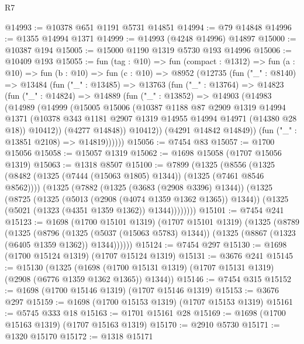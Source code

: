 \begin{lexlean}{R7}
\begin{coremodule}
@14993 := @10378 @651 @1191 @5731 @14851
@14994 := @79 @14848
@14996 := @1355 @14994 @1371
@14999 := @14993 (@4248 @14996) @14897
@15000 := @10387 @194
@15005 := @15000 @1190 @1319 @5730 @193 @14996
@15006 := @10409 @193
@15055 := fun (tag : @10) =>
  fun (compact : @1312) =>
  fun (a : @10) =>
  fun (b : @10) =>
  fun (c : @10) =>
  @8952
    (@12735
      (fun ("_" : @8140) =>
      @13484
        (fun ("_" : @13485) =>
        @13763
          (fun ("_" : @13764) =>
          @14823
            (fun ("_" : @14824) =>
            @14889
              (fun ("_" : @13852) =>
              @14903
                (@14983
                  (@14989
                    (@14999
                      (@15005
                        @15006
                        (@10387
                          @1188
                          @87
                          @2909
                          @1319
                          @14994
                          @1371
                          (@10378 @343 @1181 @2907 @1319 @14955 @14994 @14971 (@14380 @28 @18))
                          @10412))
                      (@4277 @14848))
                    @10412))
                (@4291 @14842 @14849))
              (fun ("_" : @13851 @2108) => @14819))))))
@15056 := @7454 @83
@15057 := @1700 @15056
@15058 := @15057 @1319
@15062 := @1698 @15058 (@1707 @15056 @1319)
@15063 := @1318 @8507
@15100 := @7899
    (@1325
      (@8556
        (@1325 (@8482 (@1325 (@7444 (@15063 @1805) @1344)) (@1325 (@7461 @8546 @8562))))
        (@1325
          (@7882
            (@1325 (@3683 (@2908 @3396) @1344))
            (@1325
              (@8725
                (@1325 (@5013 (@2908 (@4074 @1359 @1362 @1365)) @1344))
                (@1325 (@5021 (@1323 (@4351 @1359 @1362)) @1344))))))))
@15101 := @7454 @241
@15123 := @1698
    (@1700 @15101 @1319)
    (@1707 @15101 @1319)
    (@1325
      (@8789
        (@1325
          (@8796
            (@1325 (@5037 (@15063 @5783) @1344))
            (@1325 (@8867 (@1323 (@6405 @1359 @1362)) @1344))))))
@15124 := @7454 @297
@15130 := @1698 (@1700 @15124 @1319) (@1707 @15124 @1319)
@15131 := @3676 @241
@15145 := @15130
    (@1325
      (@1698 (@1700 @15131 @1319) (@1707 @15131 @1319) (@2908 (@6776 @1359 @1362 @1365)) @1344))
@15146 := @7454 @315
@15152 := @1698 (@1700 @15146 @1319) (@1707 @15146 @1319)
@15153 := @3676 @297
@15159 := @1698 (@1700 @15153 @1319) (@1707 @15153 @1319)
@15161 := @5745 @333 @18
@15163 := @1701 @15161 @28
@15169 := @1698 (@1700 @15163 @1319) (@1707 @15163 @1319)
@15170 := @2910 @5730
@15171 := @1320 @15170
@15172 := @1318 @15171

\end{coremodule}
\end{lexlean}
